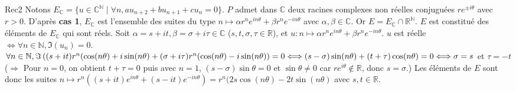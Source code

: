 \documentclass[12pt,a4paper]{report}
\begin{document}
\begin{demonstration}{Rec2}
\newline Notons $E_\mathbb{C} = \{ u \in \mathbb{C}^\mathbb{N} \mid \forall n, au_{n+2}+bu_{n+1}+cu_n =0 \}$.
\newline $P$ admet dans $\mathbb{C}$ deux racines complexes non réelles conjuguées $re^{\pm i\theta}$ avec $r>0$.
\newline D'après \textbf{cas 1}, $E_\mathbb{C}$ est l'ensemble des suites du type $n \mapsto \alpha r^n e^{in\theta} + \beta r^n e^{-in\theta}$ avec $\alpha,\beta \in \mathbb{C}$.
\newline Or $E=E_\mathbb{C} \cap \mathbb{R}^{\mathbb{N}}$. $E$ est constitué des éléments de $E_\mathbb{C}$ qui sont réels.
\newline Soit $\alpha = s+it, \beta = \sigma +i\tau \in \mathbb{C}$ ($s,t,\sigma,\tau \in \mathbb{R}$),
\newline et $u : n \mapsto \alpha r^n e^{in\theta} + \beta r^n e^{-in\theta}$. $u$ est réelle $\Longleftrightarrow \forall n \in \mathbb{N}, \Im(u_n)=0$.
\newline $\forall n \in \mathbb{N}, \Im\left((s+it)r^n(\cos(n\theta) +i\sin(n\theta) + (\sigma + i \tau)r^n (\cos(n\theta) - i \sin(n\theta)\right) =0
\newline \Longleftrightarrow (s-\sigma)\sin(n\theta) + (t+\tau)\cos(n\theta) = 0
\newline \Longleftrightarrow \sigma = s$ et $\tau = -t$
\newline ($\Longrightarrow$ Pour $n=0$, on obtient $t+\tau=0$ puis avec $n=1$, $(s-\sigma)\sin \theta = 0$ et $\sin \theta \neq 0$ car $re^{i\theta} \not \in \mathbb{R}$, donc $s=\sigma$.)
\newline Les éléments de $E$ sont donc les suites $n \mapsto r^n \left((s+it)e^{in\theta}+(s-it)e^{-in\theta}\right) = r^n (2s \cos (n\theta)-2t \sin(n\theta)$
\newline avec $s,t \in \mathbb{R}$.
\end{demonstration}
\end{document}
